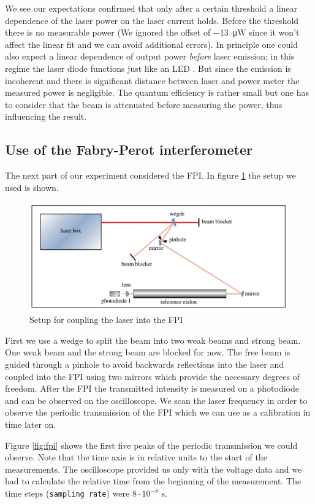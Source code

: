 \documentclass[11pt,a4paper,notitlepage]{scrartcl}
\begin{document}
We see our expectations confirmed that only after a certain threshold a linear dependence of the laser power on the laser current holds. Before the threshold there is no measurable power (We ignored the offset of \SI{-13}{\micro\W} since it won't affect the linear fit and we can avoid additional errors). In principle one could also expect a linear dependence of output power \emph{before} laser emission; in this regime the laser diode functions just like an LED \cite{laser}. But since the emission is incoherent and there is significant distance between laser and power meter the measured power is negligible. The quantum efficiency is rather small but one has to consider that the beam is attenuated before measuring the power, thus influencing the result.
\subsection{Use of the Fabry-Perot interferometer}
The next part of our experiment considered the FPI. In figure \ref{fig:FPI} the setup we used is shown. 
\begin{figure}[htbp]
	\centering
	\includegraphics[width=\linewidth]{figs/experimental_setup/setup2.png}
	\caption{Setup for coupling the laser into the FPI \cite{manual}}
	\label{fig:FPI}
\end{figure}

First we use a wedge to split the beam into two weak beams and strong beam. One weak beam and the strong beam are blocked for now. The free beam is guided through a pinhole to avoid backwards reflections into the laser \cite{manual} and coupled into the FPI using two mirrors which provide the necessary degrees of freedom. After the FPI the transmitted intensity is measured on a photodiode and can be observed on the oscilloscope. We scan the laser frequency in order to observe the periodic transmission of the FPI which we can use as a calibration in time later on.

Figure \ref{fig:fpi} shows the first five peaks of the periodic transmission we could observe. Note that the time axis is in relative units to the start of the measurements. The oscilloscope provided us only with the voltage data and we had to calculate the relative time from the beginning of the measurement. The time steps (\texttt{sampling rate}) were $8\cdot10^{-8}$ s.
\end{document}
